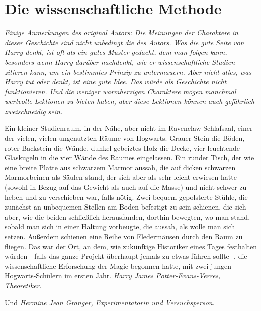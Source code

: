 \chapter{Die wissenschaftliche Methode}

\emph{Einige Anmerkungen des original Autors: Die Meinungen der Charaktere in
dieser Geschichte sind nicht unbedingt die des Autors. Was die gute Seite von
Harry denkt, ist oft als ein gutes Muster gedacht, dem man folgen kann,
besonders wenn Harry darüber nachdenkt, wie er wissenschaftliche Studien
zitieren kann, um ein bestimmtes Prinzip zu untermauern. Aber nicht alles, was
Harry tut oder denkt, ist eine gute Idee. Das würde als Geschichte nicht
funktionieren. Und die weniger warmherzigen Charaktere mögen manchmal wertvolle
Lektionen zu bieten haben, aber diese Lektionen können auch gefährlich
zweischneidig sein. }

Ein kleiner Studienraum, in der Nähe, aber nicht im Ravenclaw-Schlafsaal, einer
der vielen, vielen ungenutzten Räume von Hogwarts. Grauer Stein die Böden, roter
Backstein die Wände, dunkel gebeiztes Holz die Decke, vier leuchtende Glaskugeln
in die vier Wände des Raumes eingelassen. Ein runder Tisch, der wie eine breite
Platte aus schwarzem Marmor aussah, die auf dicken schwarzen Marmorbeinen als
Säulen stand, der sich aber als sehr leicht erwiesen hatte (sowohl in Bezug auf
das Gewicht als auch auf die Masse) und nicht schwer zu heben und zu verschieben
war, falls nötig. Zwei bequem gepolsterte Stühle, die zunächst an unbequemen
Stellen am Boden befestigt zu sein schienen, die sich aber, wie die beiden
schließlich herausfanden, dorthin bewegten, wo man stand, sobald man sich in
einer Haltung vorbeugte, die aussah, als wolle man sich setzen. Außerdem
schienen eine Reihe von Fledermäusen durch den Raum zu fliegen. Das war der Ort,
an dem, wie zukünftige Historiker eines Tages festhalten würden - falls das
ganze Projekt überhaupt jemals zu etwas führen sollte -, die wissenschaftliche
Erforschung der Magie begonnen hatte, mit zwei jungen Hogwarts-Schülern im
ersten Jahr. \emph{Harry James Potter-Evans-Verres, Theoretiker}.

Und \emph{Hermine Jean Granger, Experimentatorin und Versuchsperson}.

